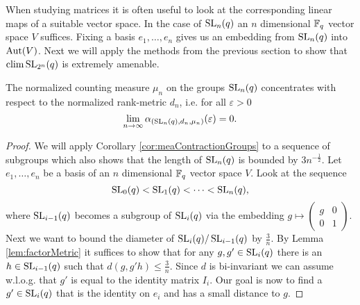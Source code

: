 When studying matrices it is often useful to look at the corresponding linear maps of a suitable vector space. 
In the case of $\operatorname{SL}_n(q)$ an $n$ dimensional $\mathbb{F}_q$ vector space $V$ suffices. Fixing a basis $e_1,\dots,e_n$ gives us an embedding from $\operatorname{SL}_n(q)$ into $\operatorname{Aut}(V)$. Next we will apply the methods from the previous section to show that $\operatorname{clim} \operatorname{SL}_{2^n}(q)$ is extremely amenable.
\begin{theorem}\label{thm:SLConcentrates}
The normalized counting measure $\mu_n$ on the groups $\operatorname{SL}_{n}(q)$ concentrates with respect to the normalized rank-metric $d_n$, i.e. for all $\varepsilon>0$
\[\lim_{n\to\infty} \alpha_{(\operatorname{SL}_{n}(q), d_n, \mu_n)}(\varepsilon)=0 .\]
\end{theorem}
\begin{proof}
We will apply Corollary \ref{cor:meaContractionGroups} to a sequence of subgroups which also shows that the length of  $\operatorname{SL}_n(q)$ is bounded by $3n^{-\frac{1}{2}}$.
Let $e_1,\dots,e_n$ be a basis of an $n$ dimensional $\mathbb{F}_q$ vector space $V$. Look at the sequence
\[\operatorname{SL}_0(q)<\operatorname{SL}_1(q)<\dots<\operatorname{SL}_n(q),\]
where $\operatorname{SL}_{i-1}(q)$ becomes a subgroup of $\operatorname{SL}_i(q)$ via the embedding $g\mapsto 
\begin{pmatrix}
g&0\\
0&1
\end{pmatrix}$. Next we want to bound the diameter of $\operatorname{SL}_{i}(q)/\operatorname{SL}_{i-1}(q)$ by $\frac{3}{n}$. By Lemma \ref{lem:factorMetric} it suffices to show that for any $g,g'\in\operatorname{SL}_i(q)$ there is an $h\in \operatorname{SL}_{i-1}(q)$ such that $d(g,g'h)\leq\frac{3}{n}$. Since $d$ is bi-invariant we can assume w.l.o.g. that $g'$ is equal to the identity matrix $I_i$. 
Our goal is now to find a $g'\in\operatorname{SL}_i(q)$ that is the identity on $e_i$ and has a small distance to $g$.


\end{proof}
